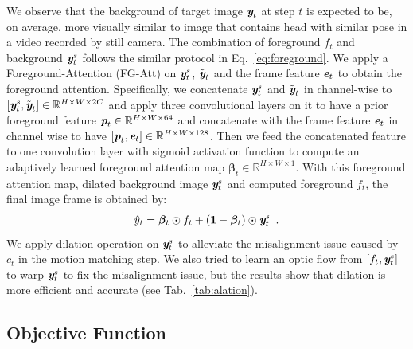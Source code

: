 \documentclass[runningheads]{llncs}
\def\mathbi#1{\textbf{\em #1}}
\begin{document}
We observe that the background of target image $\mathbi{y}_t$ at step $t$ is expected to be, on average, more visually similar to image that contains head with similar pose in a video recorded by still camera. The combination of foreground $f_t$ and background $\mathbi{y}_t^s$ follows the similar protocol in Eq.~\ref{eq:foreground}. We apply a Foreground-Attention (FG-Att) on $\mathbi{y}_t^s$, $ \tilde{\mathbi{y}}_t$ and the frame feature $\mathbi{e}_t$ to obtain the foreground attention. Specifically, we concatenate  $\mathbi{y}_t^s$ and $\tilde{\mathbi{y}}_t$ in channel-wise to $[\mathbi{y}_t^s, \tilde{\mathbi{y}}_t] \in \mathbb{R}^{H\times W \times 2C}$ and apply three convolutional layers on it to have a prior foreground feature $\mathbi{p}_t \in \mathbb{R}^{H\times W \times 64}$ and concatenate with the frame feature $\mathbi{e}_t$ in channel wise to have $[\mathbi{p}_t, \mathbi{e}_t] \in \mathbb{R}^{H\times W \times 128}$. Then we feed the concatenated feature to one convolution layer with sigmoid activation function to compute an adaptively learned foreground attention map $\boldsymbol{\beta}_t \in \mathbb{R}^{H\times W \times 1}$. With this foreground attention map, dilated background image $\mathbi{y}_t^s$ and computed foreground $f_t$, the final image frame is obtained by:
\begin{equation}
\begin{aligned}
 \hat{y}_t =   \boldsymbol{\beta}_t \odot f_t + (\mathbf{1}- \boldsymbol{\beta}_t ) \odot\mathbi{y}_t^s  \enspace.
\end{aligned}
\label{eq:background}    
\end{equation}
We apply dilation operation on $\mathbi{y}_t^s$ to alleviate the misalignment issue caused by $c_t$ in the motion matching step. We also tried to learn an optic flow from $[f_t, \mathbi{y}_t^s ]$ to warp $\mathbi{y}_t^s$ to fix the misalignment issue, but the results show that dilation is more efficient and accurate (see Tab.~\ref{tab:alation}).
 
\subsection{Objective Function}
\label{subsec:loss}
\end{document}
